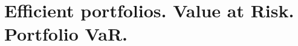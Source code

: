 \chapter{Efficient portfolios. Value at Risk. Portfolio VaR.}
\label{ch:09}






























